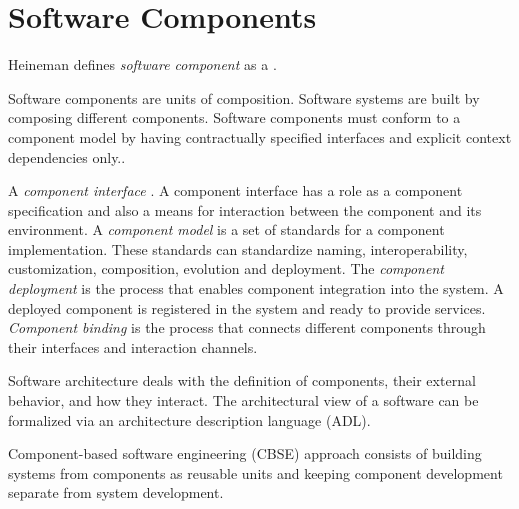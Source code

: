 \section{Software Components}
Heineman defines \emph{software component} as a
\cite{heineman_component-based_2001}.

Software components are units of composition. Software systems are built by composing different components.  Software components must conform to a component model by having contractually specified interfaces and explicit context dependencies only.\cite{szyperski_component_2002}.

A \emph{component	interface} \cite{crnkovic_software_2011}.
A component interface has a role as a component specification and also a means for interaction between the component and its environment.
A \emph{component model} is a set of standards for a component implementation. These standards can standardize naming, interoperability, customization, composition, evolution and deployment.\cite{heineman_component-based_2001}
The \emph{component deployment} is the process that enables component integration into the system. A deployed component is registered in the system and ready to provide services\cite{crnkovic_software_2011}.
\emph{Component binding} is the process that connects different components through their interfaces and interaction channels.

Software architecture deals with the definition of components, their external behavior, and how they interact\cite{kaur_component_2010}. The architectural view of a software can be formalized via an architecture description language (ADL)\cite{medvidovic_classification_2000}.


Component-based software engineering (CBSE) approach consists of building systems from components as reusable units and keeping component development separate from system development\cite{crnkovic_software_2011}.

